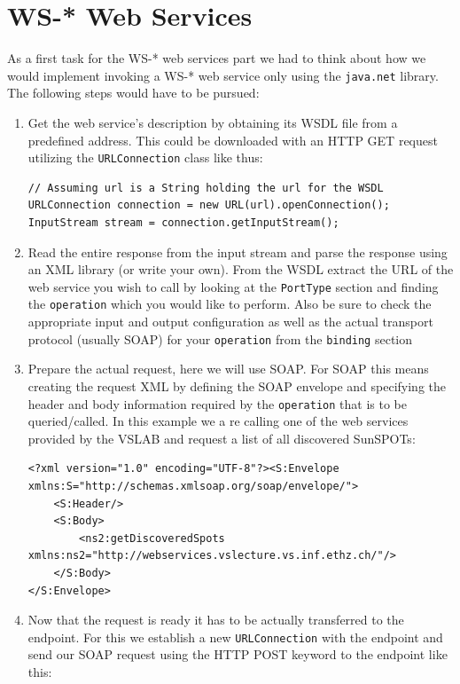 \documentclass{report}
\begin{document}
\section{WS-* Web Services}
As a first task for the WS-* web services part we had to think about how we would implement invoking a WS-* web service only using the \texttt{java.net} library. The following steps would have to be pursued:
\begin{enumerate}
	\item Get the web service's description by obtaining its WSDL file from a predefined address. This could be downloaded with an HTTP GET request utilizing the \texttt{URLConnection} class like thus:
	\begin{lstlisting}
// Assuming url is a String holding the url for the WSDL
URLConnection connection = new URL(url).openConnection();
InputStream stream = connection.getInputStream();
	\end{lstlisting}
	\item Read the entire response from the input stream and parse the response using an XML library (or write your own). From the WSDL extract the URL of the web service you wish to call by looking at the \texttt{PortType} section and finding the \texttt{operation} which you would like to perform. Also be sure to check the appropriate input and output configuration as well as the actual transport protocol (usually SOAP) for your \texttt{operation} from the \texttt{binding} section
	\item Prepare the actual request, here we will use SOAP. For SOAP this means creating the request XML by defining the SOAP envelope and specifying the header and body information required by the \texttt{operation} that is to be queried/called. In this example we a re calling one of the web services provided by the VSLAB and request a list of all discovered SunSPOTs:
	\begin{lstlisting}
<?xml version="1.0" encoding="UTF-8"?><S:Envelope xmlns:S="http://schemas.xmlsoap.org/soap/envelope/">
    <S:Header/>
    <S:Body>
        <ns2:getDiscoveredSpots xmlns:ns2="http://webservices.vslecture.vs.inf.ethz.ch/"/>
    </S:Body>
</S:Envelope>
	\end{lstlisting}
	\item Now that the request is ready it has to be actually transferred to the endpoint. For this we establish a new \texttt{URLConnection} with the endpoint and send our SOAP request using the HTTP POST keyword to the endpoint like this:

\end{enumerate}
\end{document}
